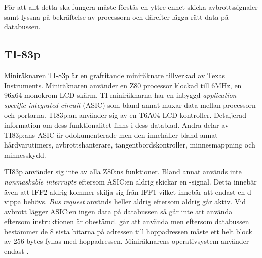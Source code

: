 \documentclass[main.tex]{subfiles}
\begin{document}
För att allt detta ska fungera måste förstås en yttre enhet skicka
avbrottssignaler samt lyssna på bekräftelse av processorn och därefter lägga
rätt data på databussen.

\subsection{TI-83p}
Miniräknaren TI-83p är en grafritande miniräknare tillverkad av Texas
Instruments. Miniräknaren använder en Z80 processor klockad till 6MHz, en 96x64
monokrom LCD-skärm. TI-miniräknarna har en inbyggd {\it application specific
integrated circuit} (ASIC) som bland annat muxar data mellan processorn och
portarna. TI83p:an använder sig av en T6A04 LCD kontroller. Detaljerad
information om dess funktionalitet finns i dess datablad\cite{t6a04}. Andra
delar av TI83p:ans ASIC är odokumenterade men den innehåller bland annat
hårdvarutimers, avbrottshanterare, tangentbordskontroller, minnesmappning och
minnesskydd.

TI83p använder sig inte av alla Z80:ns funktioner. Bland annat används inte
{\it nonmaskable interrupts} eftersom ASIC:en aldrig skickar en
-signal. Detta innebär även att IFF2 aldrig kommer skilja sig från
IFF1 vilket innebär att endast en d-vippa behövs. {\it Bus request} används
heller aldrig eftersom  aldrig går aktiv. Vid avbrott lägger
ASIC:en ingen data på databussen så  går inte att använda eftersom
instruktionen är obestämd.  går att använda men eftersom databussen
bestämmer de 8 sista bitarna på adressen till hoppadressen måste ett helt block
av 256 bytes fyllas med hoppadressen. Miniräknarens operativsystem använder
endast .


\cite{m45}
\clearpage
\end{document}
